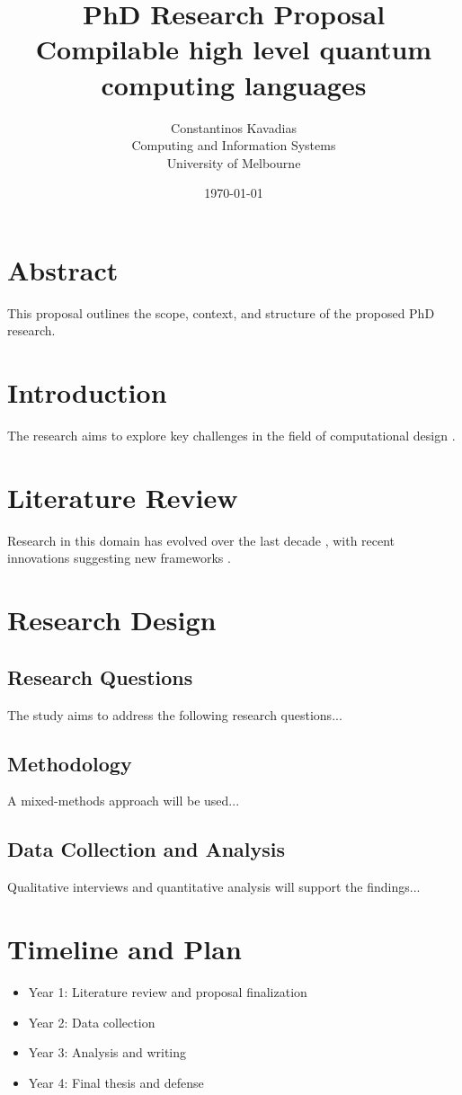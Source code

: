 \documentclass[journal,onecolumn, compsoc]{IEEEtran}
\title{PhD Research Proposal\\\large{Compilable high level quantum computing languages}}
\author{Constantinos Kavadias\\Computing and Information Systems\\University of Melbourne}
\date{\today}
\begin{document}
\maketitle

\newpage
\tableofcontents
\newpage

\section*{Abstract}
This proposal outlines the scope, context, and structure of the proposed PhD research.

\section{Introduction}
The research aims to explore key challenges in the field of computational design \cite{sample2023}.

\section{Literature Review}
Research in this domain has evolved over the last decade \cite{doe2020example}, with recent innovations suggesting new frameworks \cite{smith2019conference}.

\section{Research Design}
\subsection{Research Questions}
The study aims to address the following research questions...

\subsection{Methodology}
A mixed-methods approach will be used...

\subsection{Data Collection and Analysis}
Qualitative interviews and quantitative analysis will support the findings...

\section{Timeline and Plan}
\begin{itemize}
    \item Year 1: Literature review and proposal finalization
    \item Year 2: Data collection
    \item Year 3: Analysis and writing
    \item Year 4: Final thesis and defense
\end{itemize}
\end{document}
